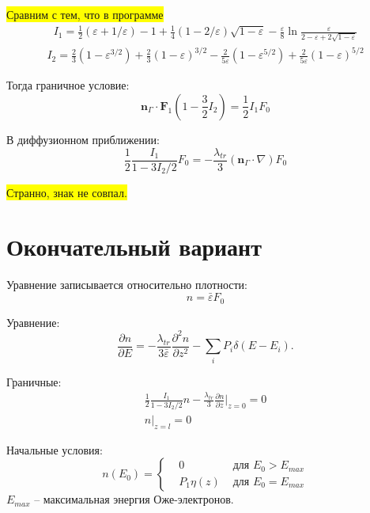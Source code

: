 \documentclass[a4paper,12pt]{article} %
\newcommand{\dff}[2]{\frac{\partial #1}{\partial #2}}
\newcommand{\dfn}[3]{\frac{\partial^#1 #2}{\partial #3^#1}}
\renewcommand{\vec}[1]{\bm{#1}}
\newcommand{\eps}{\varepsilon}
\begin{document}
\colorbox{yellow}{Сравним с тем, что в программе}
\begin{gather*}
I_1 =
\frac{1}{2} (\eps + 1/\eps) - 1 +
\frac{1}{4} (1 - 2/\eps)\sqrt{1 - \eps} -
\frac{\eps}{8} \ln \frac{\eps}{2 - \eps + 2 \sqrt{1 - \eps}}
\end{gather*}
\begin{gather*}
I_2 =
\frac{2}{3} (1 -\eps^{3/2})
+ \frac{2}{3} (1 -\eps)^{3/2}
- \frac{2}{5 \eps} (1 -\eps^{5/2})
+ \frac{2}{5 \eps} (1 -\eps)^{5/2}
\end{gather*}

Тогда граничное условие:
\begin{equation}
    \vec{n}_\Gamma \cdot \vec{F}_1 \left(1 - \frac{3}{2} I_2 \right) = \frac{1}{2} I_1 F_0
\end{equation}

В диффузионном приближении:
\begin{equation}
    \frac{1}{2} \frac{I_1}{1 - 3 I_2/2} F_0 = -\frac{\lambda_{tr}}{3}
    (\vec{n}_\Gamma \cdot \nabla) F_0
\end{equation}

\colorbox{yellow}{Странно, знак не совпал.}

\clearpage
\section{Окончательный вариант}

Уравнение записывается относительно плотности:
\begin{equation}
    n = \bar{\eps} F_0
\end{equation}


Уравнение:
\begin{equation}
    \dff{n}{E} = - \frac{\lambda_{tr}}{3\bar{\eps}}\dfn{2}{n}{z} - \sum_{i} P_i\delta(E - E_i).
\end{equation}

Граничные:
\begin{gather}
    \frac{1}{2} \frac{I_1}{1 - 3 I_2/2} n - \frac{\lambda_{tr}}{3} \dff{n}{z} \Bigg|_{z = 0} = 0 \\
    n\Bigg|_{z = l} = 0
\end{gather}

Начальные условия:
\begin{equation}
	n(E_0) = 
	\begin{cases}
		& 0 & \text{ для } E_0 > E_{max} \\
		& P_1 \eta (z) & \text{ для } E_0 = E_{max}
	\end{cases}
\end{equation}
$E_{max}$ -- максимальная энергия Оже-электронов.
\end{document}
